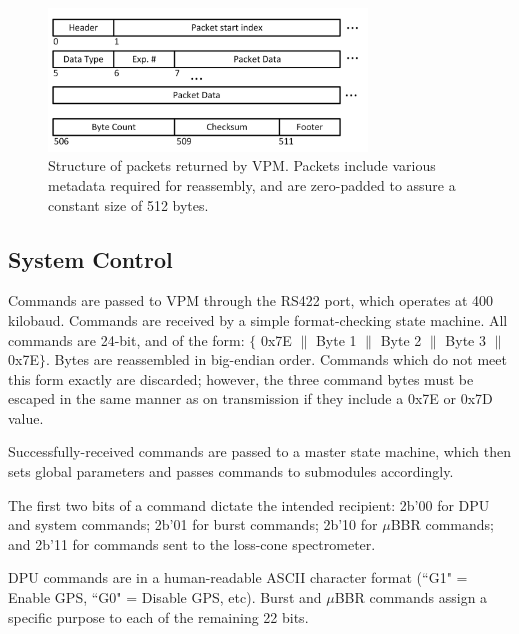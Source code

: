 \begin{figure}[t]
\begin{center}
\includegraphics[width=20pc]{figures/vpm_figures/packet_structure_column.png}

\caption[Structure of packets returned by VPM]{Structure of packets returned by VPM. Packets include various metadata required for reassembly, and are zero-padded to assure a constant size of 512 bytes.}
\label{fig:datastructure}
\end{center}
\end{figure}

\subsection{System Control}
Commands are passed to VPM through the RS422 port, which operates at 400 kilobaud. Commands are received by a simple format-checking state machine. All commands are 24-bit, and of the form: $\{$ 0x7E $\|$ Byte 1 $\|$ Byte 2 $\|$ Byte 3 $\|$ 0x7E$\}$. Bytes are reassembled in big-endian order. Commands which do not meet this form exactly are discarded; however, the three command bytes must be escaped in the same manner as on transmission if they include a 0x7E or 0x7D value.

Successfully-received commands are passed to a master state machine, which then sets global parameters and passes commands to submodules accordingly.

The first two bits of a command dictate the intended recipient: 2b'00 for DPU and system commands; 2b'01 for burst commands; 2b'10 for $\mu$BBR commands; and 2b'11 for commands sent to the loss-cone spectrometer.

DPU commands are in a human-readable ASCII character format (``G1" = Enable GPS, ``G0" = Disable GPS, etc). Burst and $\mu$BBR commands assign a specific purpose to each of the remaining 22 bits.


